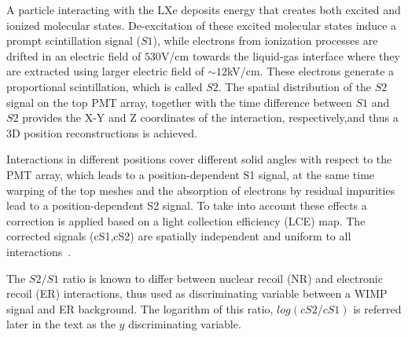 A particle interacting with the LXe deposits energy that creates both excited and ionized molecular states. De-excitation of these excited molecular states induce a prompt scintillation signal ($S1$), while 
electrons from ionization processes are drifted in an electric field of $530$V/cm towards the liquid-gas interface where they are extracted using larger electric field of $\sim12$kV/cm. 
These electrons generate a proportional scintillation, which is called $S2$. The spatial distribution of the $S2$ signal on the top PMT array, together with the time difference between $S1$ and $S2$ provides the X-Y and Z coordinates of the interaction, respectively,and thus a 3D position reconstructions is achieved.

Interactions in different positions cover different solid angles with respect to the PMT array, which leads to a position-dependent S1 signal, at the same time warping of the top meshes and the absorption of electrons by residual impurities lead to a position-dependent S2 signal. To take into account these effects a correction is applied based on a light collection efficiency (LCE) map. The corrected signals (cS1,cS2) are spatially independent and uniform to all interactions~\cite{xe100_instr2012}.

The $S2/S1$ ratio is known to differ between nuclear recoil (NR) and electronic recoil (ER) interactions, thus used as  discriminating variable between a WIMP signal and ER background.
The logarithm of this ratio, $log(cS2/cS1)$ is referred later in the text as the $y$ discriminating variable.

